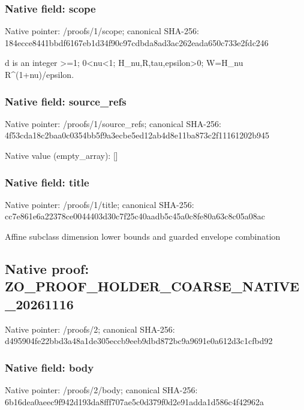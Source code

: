 \documentclass[10pt,a4paper]{article}
\begin{document}
\subsubsection{Native field: scope}
Native pointer: /proofs/1/scope; canonical SHA-256: 184ecce8441bbdf6167eb1d34f90c97cdbda8ad3ac262eada650c733e2fdc246

\begingroup\raggedright\sloppy d is an integer >=\allowbreak{}1;\allowbreak{} 0<nu<1;\allowbreak{} H\_\allowbreak{}nu,\allowbreak{}R,\allowbreak{}tau,\allowbreak{}epsilon>0;\allowbreak{} W=\allowbreak{}H\_\allowbreak{}nu R\textasciicircum{}(1+nu)/\allowbreak{}epsilon.\par\endgroup

\subsubsection{Native field: source\_\allowbreak{}refs}
Native pointer: /proofs/1/source\_\allowbreak{}refs; canonical SHA-256: 4f53cda18c2baa0c0354bb5f9a3ecbe5ed12ab4d8e11ba873c2f11161202b945

Native value (empty\_\allowbreak{}array): []

\subsubsection{Native field: title}
Native pointer: /proofs/1/title; canonical SHA-256: cc7e861e6a22378ce0044403d30c7f25c40aadb5c45a0c8fe80a63c8c05a08ac

\begingroup\raggedright\sloppy Affine subclass dimension lower bounds and guarded envelope combination\par\endgroup

\subsection{Native proof: ZO\_\allowbreak{}PROOF\_\allowbreak{}HOLDER\_\allowbreak{}COARSE\_\allowbreak{}NATIVE\_\allowbreak{}20261116}
Native pointer: /proofs/2; canonical SHA-256: d495904fe22bbd3a48a1de305eccb9eeb9dbd872bc9a9691e0a612d3c1cfbd92

\subsubsection{Native field: body}
Native pointer: /proofs/2/body; canonical SHA-256: 6b16dea0aeec9f942d193da8fff707ae5c0d379f0d2e91adda1d586c4f42962a
\end{document}

